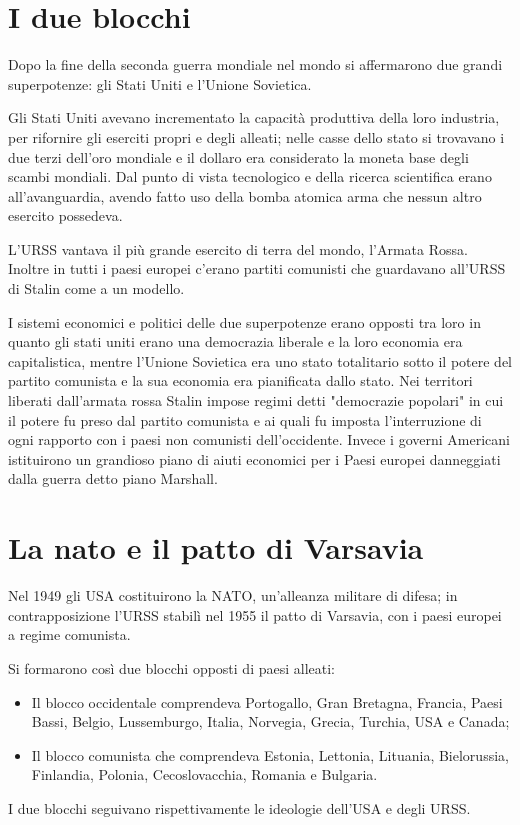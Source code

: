 \section{I due blocchi}
Dopo la fine della seconda guerra mondiale nel mondo si affermarono due grandi superpotenze: gli Stati Uniti e l'Unione Sovietica.

Gli Stati Uniti avevano incrementato la capacità produttiva della loro industria, per rifornire gli eserciti propri e degli alleati; nelle casse dello stato si trovavano i due terzi dell'oro mondiale e il dollaro era considerato la moneta base degli scambi mondiali. Dal punto di vista tecnologico e della ricerca scientifica erano all'avanguardia, avendo fatto uso della bomba atomica arma che nessun altro esercito possedeva.

L'URSS vantava il più grande esercito di terra del mondo, l'Armata Rossa. Inoltre in tutti i paesi europei c'erano partiti comunisti che guardavano all'URSS di Stalin come a un modello.

I sistemi economici e politici delle due superpotenze erano opposti tra loro in quanto gli stati uniti erano una democrazia liberale e la loro economia era capitalistica, mentre l'Unione Sovietica era uno stato totalitario sotto il potere del partito comunista e la sua economia era pianificata dallo stato. Nei territori liberati dall'armata rossa Stalin impose regimi detti "democrazie popolari" in cui il potere fu preso dal partito comunista e ai quali fu imposta l'interruzione di ogni rapporto con i paesi non comunisti dell'occidente. Invece i governi Americani istituirono un grandioso piano di aiuti economici per i Paesi europei danneggiati dalla guerra detto piano Marshall.

\section{La nato e il patto di Varsavia}
Nel 1949 gli USA costituirono la NATO, un'alleanza militare di difesa; in contrapposizione l'URSS stabilì nel 1955 il patto di Varsavia, con i paesi europei a regime comunista.

Si formarono così due blocchi opposti di paesi alleati:
\begin{itemize}
  \item Il blocco occidentale comprendeva Portogallo, Gran Bretagna, Francia, Paesi Bassi, Belgio, Lussemburgo, Italia, Norvegia, Grecia, Turchia, USA e Canada;
  \item Il blocco comunista che comprendeva Estonia, Lettonia, Lituania, Bielorussia, Finlandia, Polonia, Cecoslovacchia, Romania e Bulgaria.
\end{itemize}
I due blocchi seguivano rispettivamente le ideologie dell'USA e degli URSS.

